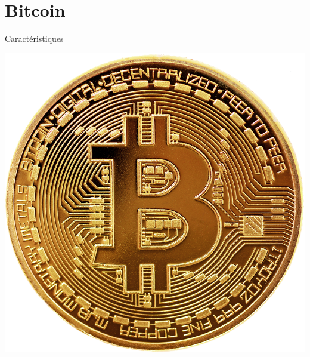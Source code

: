 \documentclass[xcolor=dvipsnames]{beamer}
\begin{document}
\section{Bitcoin}

\begin{frame}{Caractéristiques}
	\begin{center}
		\includegraphics[scale=0.05]{bitcoinLogo.png}
	\end{center}
	

\end{frame}
\end{document}
